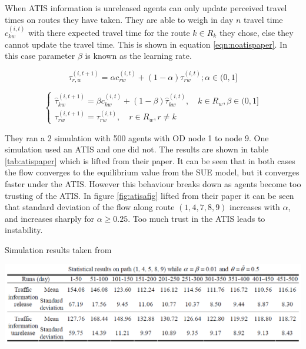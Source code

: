 \documentclass[12pt, a4paper, onecolumn]{article}
\begin{document}
When ATIS information is unreleased agents can only update perceived travel times on routes they have taken. They are able to weigh in day $n$ travel time  $c_{k w}^{(i, t)}$ with there expected travel time for the route $k \in R_k$ they chose, else they cannot update the travel time. This is shown in equation \ref{eqn:noatispaper}. In this case parameter $\beta$ is known as the learning rate.

\begin{equation}
	\tau_{r,w}^{(i, t+1)} = \alpha c_{r w}^{(i, t)} + (1-\alpha) \tau_{r w}^{(i, t)}; \alpha \in(0,1]
	\label{eqn:atispaper}
	\end{equation}

\begin{equation}
	\left\{\begin{array}{l}
	\hat{\tau}_{k w}^{(i, t+1)} = \beta c_{k w}^{(i, t)} + (1-\beta) \hat{\tau}_{k w}^{(i, t)}, \quad k \in R_{w}, \beta \in(0,1] \\
	\tau_{r w}^{(i, t+1)} = \tau_{r w}^{(i, t)}, \quad r \in R_{w}, r \neq k
	\end{array}\right.
	\label{eqn:noatispaper}
	\end{equation}

They ran a 2 simulation with 500 agents with OD node 1 to node 9. One simulation used an ATIS and one did not. The results are shown in table \ref{tab:atispaper} which is lifted from their paper. It can be seen that in both cases the flow converges to the equilibrium value from the SUE model, but it converges faster under the ATIS. However this behaviour breaks down as agents become too trusting of the ATIS. In figure \ref{fig:atisafig} lifted from their paper it can be seen that standard deviation of the flow along route $(1,4,7,8,9)$ increases with $\alpha$, and increases sharply for $\alpha \geq 0.25$. Too much trust in the ATIS leads to instability.

\begin{table}[h]
	\centering
	\caption{Simulation results taken from \cite{Liu2007}}
	\includegraphics[scale=.7]{atis_table.png}
	\label{tab:atispaper}
	\end{table}
\end{document}
